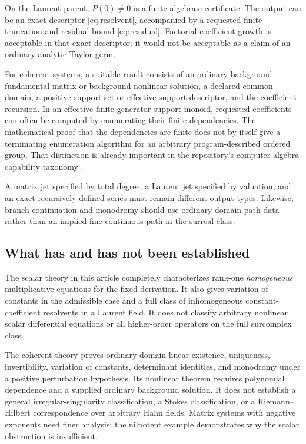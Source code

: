\documentclass[11pt,letterpaper]{article}
\numberwithin{equation}{section}
\theoremstyle{definition}
\theoremstyle{remark}
\begin{document}
On the Laurent parent, $P(0)\ne0$ is a finite algebraic certificate. The
output can be an exact descriptor \eqref{eq:resolvent}, accompanied by a
requested finite truncation and residual bound \eqref{eq:residual}.
Factorial coefficient growth is acceptable in that exact descriptor; it
would not be acceptable as a claim of an ordinary analytic Taylor germ.

For coherent systems, a suitable result consists of an ordinary background
fundamental matrix or background nonlinear solution, a declared common
domain, a positive-support set or effective support descriptor, and the
coefficient recursion. In an effective finite-generator support monoid,
requested coefficients can often be computed by enumerating their finite
dependencies. The mathematical proof that the dependencies are finite does
not by itself give a terminating enumeration algorithm for an arbitrary
program-described ordered group. That distinction is already important in
the repository's computer-algebra capability taxonomy \cite{RepoCAS}.

A matrix jet specified by total degree, a Laurent jet specified by valuation,
and an exact recursively defined series must remain different output types.
Likewise, branch continuation and monodromy should use ordinary-domain path
data rather than an implied fine-continuous path in the surreal class.

\subsection{What has and has not been established}
The scalar theory in this article completely characterizes rank-one
\emph{homogeneous} multiplicative equations for the fixed derivation. It
also gives variation of constants in the admissible case and a full class
of inhomogeneous constant-coefficient resolvents in a Laurent field.
It does not classify arbitrary nonlinear scalar differential equations or
all higher-order operators on the full surcomplex class.

The coherent theory proves ordinary-domain linear existence, uniqueness,
invertibility, variation of constants, determinant identities, and
monodromy under a positive perturbation hypothesis. Its nonlinear theorem
requires polynomial dependence and a supplied ordinary background solution.
It does not establish a general irregular-singularity classification,
a Stokes classification, or a Riemann--Hilbert correspondence over arbitrary
Hahn fields. Matrix systems with negative exponents need finer analysis:
the nilpotent example demonstrates why the scalar obstruction is insufficient.
\end{document}
